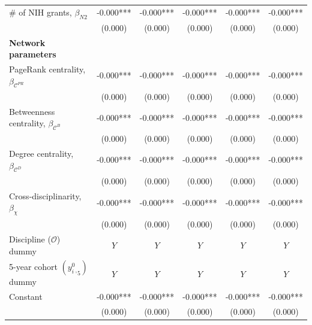 \documentclass{article}\usepackage[]{graphicx}\usepackage[]{color}
\begin{document}
\begin{table}[h!]
\begin{center}
\begin{tabular}{l c c c c c}
    \rowcolor{gray!33}
    {\#} of NIH grants, $\beta_{N2}$ 
    & -0.000*** & -0.000***  & -0.000*** & -0.000*** & -0.000*** \\
    {} 
    & (0.000)   & (0.000)    & (0.000)   & (0.000)   & (0.000) \\
    
    \hline
    
    \textbf {Network parameters}\\
    
    \rowcolor{gray!33}
    PageRank centrality, $\beta_{\mathscr{C}^{PR}}$ 
    & -0.000*** & -0.000***  & -0.000*** & -0.000*** & -0.000*** \\
    {} 
    & (0.000)   & (0.000)    & (0.000)   & (0.000)   & (0.000) \\
    
    \rowcolor{gray!33}
    Betweenness centrality, $\beta_{\mathscr{C}^{B}}$ 
    & -0.000*** & -0.000***  & -0.000*** & -0.000*** & -0.000*** \\
    {} 
    & (0.000)   & (0.000)    & (0.000)   & (0.000)   & (0.000) \\
    
    \rowcolor{gray!33}
    Degree centrality, $\beta_{\mathscr{C}^{D}}$ 
    & -0.000*** & -0.000***  & -0.000*** & -0.000*** & -0.000*** \\
    {} 
    & (0.000)   & (0.000)    & (0.000)   & (0.000)   & (0.000) \\
    
    \rowcolor{gray!33}
    Cross-disciplinarity, $\beta_{\chi}$ 
    & -0.000*** & -0.000***  & -0.000*** & -0.000*** & -0.000*** \\
    {} 
    & (0.000)   & (0.000)    & (0.000)   & (0.000)   & (0.000) \\
    
    \hline
    
    \rowcolor{gray!33} 
    Discipline ($\mathscr{O}$) dummy & $\textit{Y}$ & $\textit{Y}$ & $\textit{Y}$ & $\textit{Y}$ & $\textit{Y}$ \\
    
    \rowcolor{gray!33} 
    5-year cohort $(y{^0_i{_,}}_{5})$ dummy & $\textit{Y}$ & $\textit{Y}$ & $\textit{Y}$ & $\textit{Y}$ & $\textit{Y}$ \\
    
    \rowcolor{gray!33} 
    Constant 
    & -0.000*** & -0.000***  & -0.000*** & -0.000*** & -0.000*** \\
    {} 
    & (0.000)   & (0.000)    & (0.000)   & (0.000)   & (0.000) \\
    

\end{tabular}
\end{center}
\end{table}
\end{document}
